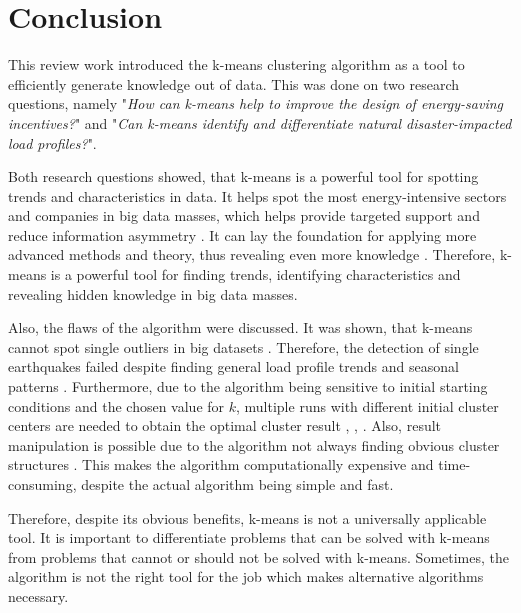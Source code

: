 \chapter{Conclusion}
\label{cha:conclusion}



This review work introduced the k-means clustering algorithm as a tool to efficiently generate knowledge out of data.
This was done on two research questions, namely "\textit{How can k-means help to improve the design of energy-saving incentives?}" and "\textit{Can k-means identify and differentiate natural disaster-impacted load profiles?}".

Both research questions showed, that k-means is a powerful tool for spotting trends and characteristics in data.
It helps spot the most energy-intensive sectors and companies in big data masses, which helps provide targeted support and reduce information asymmetry \cite{LIU-BDE}.
It can lay the foundation for applying more advanced methods and theory, thus revealing even more knowledge \cite{MAL-HBP}.
Therefore, k-means is a powerful tool for finding trends, identifying characteristics and revealing hidden knowledge in big data masses.

Also, the flaws of the algorithm were discussed.
It was shown, that k-means cannot spot single outliers in big datasets \cite{JES-IND}.
Therefore, the detection of single earthquakes failed despite finding general load profile trends and seasonal patterns \cite{JES-IND}.
Furthermore, due to the algorithm being sensitive to initial starting conditions and the chosen value for $k$, multiple runs with different initial cluster centers are needed to obtain the optimal cluster result \cite{JAI-DCB}, \cite{EZU-CPF}, \cite{BAR-LVG}.
Also, result manipulation is possible due to the algorithm not always finding obvious cluster structures \cite{BOU-RPK}.
This makes the algorithm computationally expensive and time-consuming, despite the actual algorithm being simple and fast.

Therefore, despite its obvious benefits, k-means is not a universally applicable tool.
It is important to differentiate problems that can be solved with k-means from problems that cannot or should not be solved with k-means.
Sometimes, the algorithm is not the right tool for the job which makes alternative algorithms necessary.

